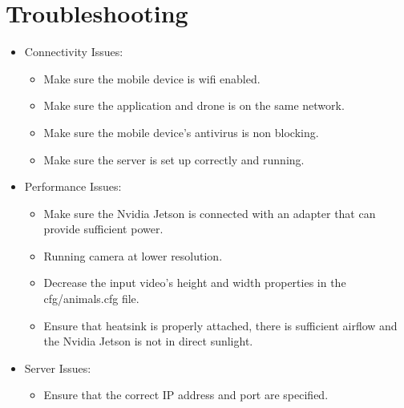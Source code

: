 \chapter{Troubleshooting}
\begin{itemize}
	\item Connectivity Issues:
	\begin{itemize}
		\item Make sure the mobile device is wifi enabled.
		\item Make sure the application and drone is on the same network.
		\item Make sure the mobile device's antivirus is non blocking.
		\item Make sure the server is set up correctly and running.
	\end{itemize}
	\item Performance Issues:
		\begin{itemize}
			\item Make sure the Nvidia Jetson is connected with an adapter that can provide sufficient power.
			\item Running camera at lower resolution.
			\item Decrease the input video's height and width properties in the cfg/animals.cfg file.
			\item Ensure that heatsink is properly attached, there is sufficient airflow and the Nvidia Jetson is not in direct sunlight.
		\end{itemize}
	\item Server Issues:
		\begin{itemize}
			\item Ensure that the correct IP address and port are specified.
		\end{itemize}
\end{itemize}
